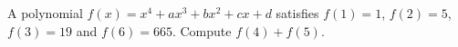 A polynomial $f(x)=x^4+ax^3+bx^2+cx+d$ satisfies $f(1)=1$, $f(2)=5$, $f(3)=19$ and $f(6)=665$. Compute $f(4)+f(5)$.
